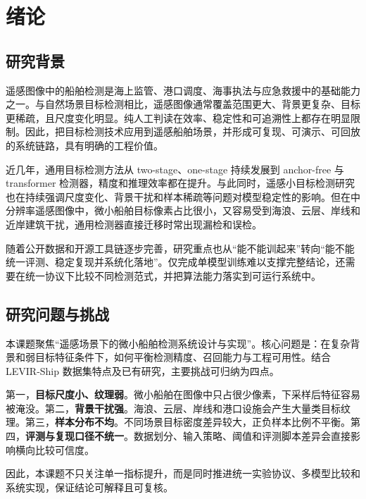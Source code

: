 
\chapter{绪论}
\label{ch:intro}

\section{研究背景}

遥感图像中的船舶检测是海上监管、港口调度、海事执法与应急救援中的基础能力之一。与自然场景目标检测相比，遥感图像通常覆盖范围更大、背景更复杂、目标更稀疏，且尺度变化明显。纯人工判读在效率、稳定性和可追溯性上都存在明显限制。因此，把目标检测技术应用到遥感船舶场景，并形成可复现、可演示、可回放的系统链路，具有明确的工程价值。

近几年，通用目标检测方法从 two-stage、one-stage 持续发展到 anchor-free 与 transformer 检测器，精度和推理效率都在提升\cite{ren2015_fasterrcnn,lin2017_fpn,lin2017_focalloss,tian2019_fcos,redmon2016_yolo,carion2020_detr,zhu2021_deformabledetr}。与此同时，遥感小目标检测研究也在持续强调尺度变化、背景干扰和样本稀疏等问题对模型稳定性的影响\cite{wang2023_sod_review,zhao2024_shipsurvey}。但在中分辨率遥感图像中，微小船舶目标像素占比很小，又容易受到海浪、云层、岸线和近岸建筑干扰，通用检测器直接迁移时常出现漏检和误检。

随着公开数据和开源工具链逐步完善，研究重点也从“能不能训起来”转向“能不能统一评测、稳定复现并系统化落地”。仅完成单模型训练难以支撑完整结论，还需要在统一协议下比较不同检测范式，并把算法能力落实到可运行系统中。

\section{研究问题与挑战}

本课题聚焦“遥感场景下的微小船舶检测系统设计与实现”。核心问题是：在复杂背景和弱目标特征条件下，如何平衡检测精度、召回能力与工程可用性。结合 LEVIR-Ship 数据集特点及已有研究\cite{chen2022_tinyship_drenet}，主要挑战可归纳为四点。

第一，\textbf{目标尺度小、纹理弱}。微小船舶在图像中只占很少像素，下采样后特征容易被淹没。第二，\textbf{背景干扰强}。海浪、云层、岸线和港口设施会产生大量类目标纹理。第三，\textbf{样本分布不均}。不同场景目标密度差异较大，正负样本比例不平衡。第四，\textbf{评测与复现口径不统一}。数据划分、输入策略、阈值和评测脚本差异会直接影响横向比较可信度。

因此，本课题不只关注单一指标提升，而是同时推进统一实验协议、多模型比较和系统实现，保证结论可解释且可复核。

